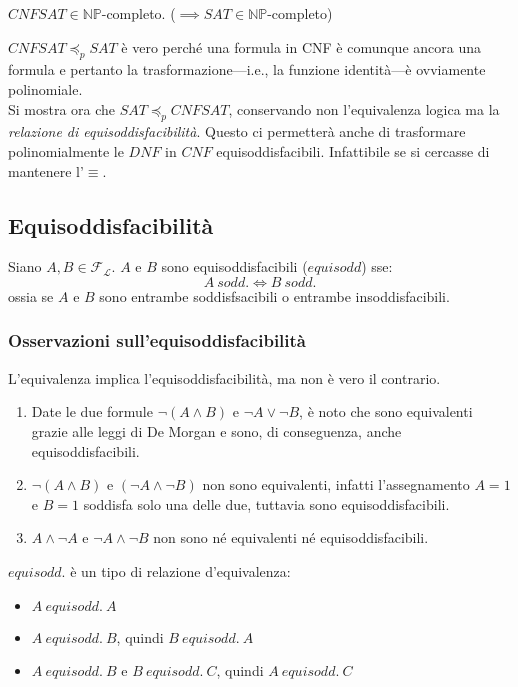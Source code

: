 \begin{teo}
        $CNFSAT \in \mathbb{NP}$-completo.
        ($\implies SAT \in \mathbb{NP}$-completo)
\end{teo}

$CNFSAT \preceq_p SAT$ è vero perché una formula in CNF è comunque ancora una formula e pertanto la trasformazione—i.e., la funzione identità—è ovviamente polinomiale.\\
Si mostra ora che $SAT \preceq_p CNFSAT$, conservando non l'equivalenza logica ma la \textit{relazione di equisoddisfacibilità}.
Questo ci permetterà anche di trasformare polinomialmente le $DNF$ in $CNF$ equisoddisfacibili. Infattibile se si cercasse di mantenere l'$\equiv$.

\subsection{Equisoddisfacibilità}
\begin{defi}[Equisoddisfacibilità]
Siano $A, B \in \mathscr{F}_\mathscr{L}$. $A$ e $B$ sono equisoddisfacibili ($equisodd$) sse:
$$
A\ sodd. \iff B\ sodd.
$$
ossia se $A$ e $B$ sono entrambe soddisfsacibili o entrambe insoddisfacibili. 
\end{defi}

\subsubsection{Osservazioni sull'equisoddisfacibilità}
\begin{ossn}
L'equivalenza implica l'equisoddisfacibilità, ma non è vero il contrario.
\begin{enumerate}
\item Date le due formule $\neg (A \land B)$ e $\neg A \lor \neg B$, è noto 
che sono equivalenti grazie alle leggi di De Morgan e sono, di conseguenza, 
anche equisoddisfacibili.
\item $\neg (A \land B)$ e $(\neg A \land \neg B)$ non sono equivalenti, 
infatti l'assegnamento $A=1$ e $B=1$ soddisfa solo una delle due, tuttavia 
sono equisoddisfacibili.
\item $A \land \neg A$ e $\neg A \land \neg B$ non sono né equivalenti né
equisoddisfacibili.
\end{enumerate}
\end{ossn}

\begin{ossn}
$equisodd.$ è un tipo di relazione d'equivalenza:
\begin{itemize}
  \item $A\ equisodd.\ A$
  \item $A\ equisodd.\ B$, quindi $B\ equisodd.\ A$
  \item $A\ equisodd.\ B$ e $B\ equisodd.\ C$, quindi $A\ equisodd.\ C$
\end{itemize}
\end{ossn}


